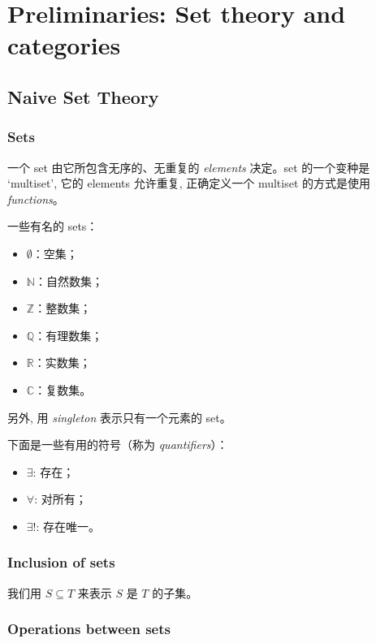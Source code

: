 \chapter{Preliminaries: Set theory and categories}
\section{Naive Set Theory}\label{sec:1.1}

\subsection{Sets}\label{sec:1.1.1}

一个 set 由它所包含无序的、无重复的 \emph{elements} 决定。set 的一个变种是 `multiset', 它的 elements 允许重复, 正确定义一个 multiset 的方式是使用 \emph{functions}。

一些有名的 sets：
\begin{itemize}
    \item \(\emptyset\)：空集；
    \item \(\mathbb{N}\)：自然数集；
    \item \(\mathbb{Z}\)：整数集；
    \item \(\mathbb{Q}\)：有理数集；
    \item \(\mathbb{R}\)：实数集；
    \item \(\mathbb{C}\)：复数集。
\end{itemize}

另外, 用 \emph{singleton} 表示只有一个元素的 set。

下面是一些有用的符号（称为 \emph{quantifiers}）：

\begin{itemize}
    \item \(\exists\): 存在；
    \item \(\forall\): 对所有；
    \item \(\exists!\): 存在唯一。
\end{itemize}

\subsection{Inclusion of sets}\label{sec:1.1.2}

我们用 \(S \subseteq T\) 来表示 \(S\) 是 \(T\) 的子集。

\subsection{Operations between sets}\label{sec:1.1.3}

